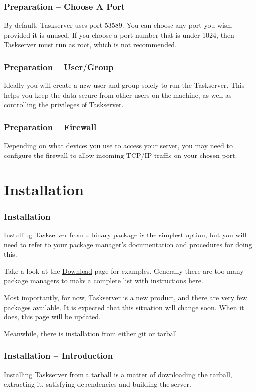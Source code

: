 \documentclass[t,handout]{beamer}
\begin{document}
\begin{frame}[fragile]\frametitle{Preparation -- Choose A  Port}
	\vfill
	By default, Taskserver uses port 53589. You can choose any port you wish, provided it is unused. If you choose a port number that is under 1024, then Taskserver must run as root, which is not recommended.
	\vfill
\end{frame}

\begin{frame}[fragile]\frametitle{Preparation -- User/Group}
	\vfill
    Ideally you will create a new user and group solely to run the Taskserver. This helps you keep the data secure from other users on the machine, as well as controlling the privileges of Taskserver.
	\vfill
\end{frame}

\begin{frame}[fragile]\frametitle{Preparation -- Firewall}
	\vfill
	Depending on what devices you use to access your server, you may need to configure the firewall to allow incoming TCP/IP traffic on your chosen port.
	\vfill
\end{frame}

\section{Installation}

\begin{frame}[fragile]\frametitle{Installation}
    Installing Taskserver from a binary package is the simplest option, but you will need to refer to your package manager's documentation and procedures for doing this.

    Take a look at the \href{http://taskwarrior.org/download/#dist}{Download} page for examples. Generally there are too many package managers to make a complete list with instructions here.

    Most importantly, for now, Taskserver is a new product, and there are very few packages available.  It is expected that this situation will change soon.  When it does, this page will be updated.

    Meanwhile, there is installation from either git or tarball.
\end{frame}

\begin{frame}[fragile]\frametitle{Installation -- Introduction}
    \vfill
    Installing Taskserver from a tarball is a matter of downloading the tarball, extracting it, satisfying dependencies and building the server.
    \vfill
\end{frame}
\end{document}
